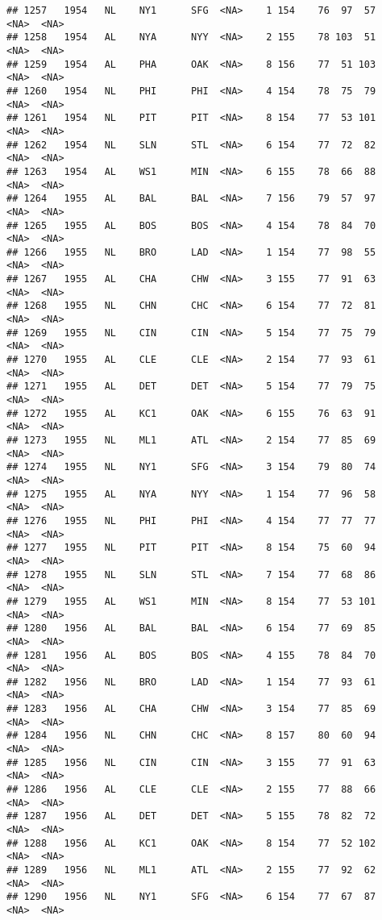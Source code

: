 \documentclass[]{article}
\begin{document}
\begin{verbatim}
## 1257   1954   NL    NY1      SFG  <NA>    1 154    76  97  57   <NA>  <NA>
## 1258   1954   AL    NYA      NYY  <NA>    2 155    78 103  51   <NA>  <NA>
## 1259   1954   AL    PHA      OAK  <NA>    8 156    77  51 103   <NA>  <NA>
## 1260   1954   NL    PHI      PHI  <NA>    4 154    78  75  79   <NA>  <NA>
## 1261   1954   NL    PIT      PIT  <NA>    8 154    77  53 101   <NA>  <NA>
## 1262   1954   NL    SLN      STL  <NA>    6 154    77  72  82   <NA>  <NA>
## 1263   1954   AL    WS1      MIN  <NA>    6 155    78  66  88   <NA>  <NA>
## 1264   1955   AL    BAL      BAL  <NA>    7 156    79  57  97   <NA>  <NA>
## 1265   1955   AL    BOS      BOS  <NA>    4 154    78  84  70   <NA>  <NA>
## 1266   1955   NL    BRO      LAD  <NA>    1 154    77  98  55   <NA>  <NA>
## 1267   1955   AL    CHA      CHW  <NA>    3 155    77  91  63   <NA>  <NA>
## 1268   1955   NL    CHN      CHC  <NA>    6 154    77  72  81   <NA>  <NA>
## 1269   1955   NL    CIN      CIN  <NA>    5 154    77  75  79   <NA>  <NA>
## 1270   1955   AL    CLE      CLE  <NA>    2 154    77  93  61   <NA>  <NA>
## 1271   1955   AL    DET      DET  <NA>    5 154    77  79  75   <NA>  <NA>
## 1272   1955   AL    KC1      OAK  <NA>    6 155    76  63  91   <NA>  <NA>
## 1273   1955   NL    ML1      ATL  <NA>    2 154    77  85  69   <NA>  <NA>
## 1274   1955   NL    NY1      SFG  <NA>    3 154    79  80  74   <NA>  <NA>
## 1275   1955   AL    NYA      NYY  <NA>    1 154    77  96  58   <NA>  <NA>
## 1276   1955   NL    PHI      PHI  <NA>    4 154    77  77  77   <NA>  <NA>
## 1277   1955   NL    PIT      PIT  <NA>    8 154    75  60  94   <NA>  <NA>
## 1278   1955   NL    SLN      STL  <NA>    7 154    77  68  86   <NA>  <NA>
## 1279   1955   AL    WS1      MIN  <NA>    8 154    77  53 101   <NA>  <NA>
## 1280   1956   AL    BAL      BAL  <NA>    6 154    77  69  85   <NA>  <NA>
## 1281   1956   AL    BOS      BOS  <NA>    4 155    78  84  70   <NA>  <NA>
## 1282   1956   NL    BRO      LAD  <NA>    1 154    77  93  61   <NA>  <NA>
## 1283   1956   AL    CHA      CHW  <NA>    3 154    77  85  69   <NA>  <NA>
## 1284   1956   NL    CHN      CHC  <NA>    8 157    80  60  94   <NA>  <NA>
## 1285   1956   NL    CIN      CIN  <NA>    3 155    77  91  63   <NA>  <NA>
## 1286   1956   AL    CLE      CLE  <NA>    2 155    77  88  66   <NA>  <NA>
## 1287   1956   AL    DET      DET  <NA>    5 155    78  82  72   <NA>  <NA>
## 1288   1956   AL    KC1      OAK  <NA>    8 154    77  52 102   <NA>  <NA>
## 1289   1956   NL    ML1      ATL  <NA>    2 155    77  92  62   <NA>  <NA>
## 1290   1956   NL    NY1      SFG  <NA>    6 154    77  67  87   <NA>  <NA>

\end{verbatim}
\end{document}
